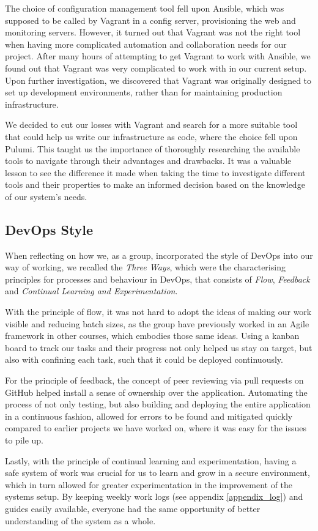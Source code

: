 The choice of configuration management tool fell upon Ansible, which was supposed to be called by Vagrant in a config server, provisioning the web and monitoring servers.
However, it turned out that Vagrant was not the right tool when having more complicated automation and collaboration needs for our project.
After many hours of attempting to get Vagrant to work with Ansible, we found out that Vagrant was very complicated to work with in our current setup\cite{issue178-vagrant-ansible}. Upon further investigation, we discovered that Vagrant was originally designed to set up development environments, rather than for maintaining production infrastructure\cite{vagrant_vs_terraform}.

We decided to cut our losses with Vagrant and search for a more suitable tool that could help us write our infrastructure as code, where the choice fell upon Pulumi.
This taught us the importance of thoroughly researching the available tools to navigate through their advantages and drawbacks.
It was a valuable lesson to see the difference it made when taking the time to investigate different tools and their properties to make an informed decision based on the knowledge of our system's needs.

\subsection{DevOps Style}
When reflecting on how we, as a group, incorporated the style of DevOps into our way of working, we recalled the \textit{Three Ways}, which were the characterising principles for processes and behaviour in DevOps, that consists of \textit{Flow}, \textit{Feedback} and \textit{Continual Learning and Experimentation}\cite{devopshandbook}.

With the principle of flow, it was not hard to adopt the ideas of making our work visible and reducing batch sizes, as the group have previously worked in an Agile framework in other courses, which embodies those same ideas. Using a kanban board to track our tasks and their progress not only helped us stay on target, but also with confining each task, such that it could be deployed continuously\cite{devopshandbook}.

For the principle of feedback, the concept of peer reviewing via pull requests on GitHub helped install a sense of ownership over the application. Automating the process of not only testing, but also building and deploying the entire application in a continuous fashion, allowed for errors to be found and mitigated quickly compared to earlier projects we have worked on, where it was easy for the issues to pile up.

Lastly, with the principle of continual learning and experimentation, having a safe system of work\cite{devopshandbook} was crucial for us to learn and grow in a secure environment, which in turn allowed for greater experimentation in the improvement of the systems setup. By keeping weekly work logs (see appendix \ref{appendix_log}) and guides easily available, everyone had the same opportunity of better understanding of the system as a whole.
